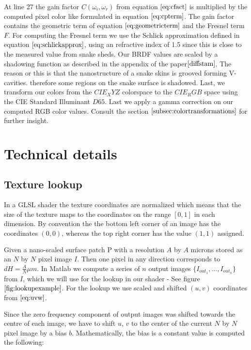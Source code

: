At line 27 the gain factor $C(\omega_i, \omega_r)$ from equation $\ref{eq:cfact}$ is multiplied by the computed pixel color like formulated in equation $\ref{eq:cpterm}$. The gain factor contains the geometric term of equation $\ref{eq:geometricterm}$ and the Fresnel term $F$. For computing the Fresnel term we use the Schlick approximation defined in equation $\ref{eq:schlickapprox}$, using an refractive index of 1.5 since this is close to the measured value from snake sheds. Our BRDF values are scaled by a shadowing function as described in the appendix of the paper$\cite{diffstam}$. The reason or this is that the nanostructure of a snake skins is grooved forming V-cavities. therefore some regions on the snake surface is shadowed. Last, we transform our colors from the $CIE_XYZ$ colorspace to the $CIE_RGB$ space using the CIE Standard Illuminant $D65$. Last we apply a gamma correction on our computed RGB color values. Consult the section $\ref{subsec:colortransformations}$ for further insight.

\section{Technical details}
\subsection{Texture lookup}
\label{sec:texturelookupcoords}
In a GLSL shader the texture coordinates are normalized which means that the size of the texture maps to the coordinates on the range $[0,1]$ in each dimension. By convention the the bottom left corner of an image has the coordinates $(0,0)$, whereas the top right corner has the value $(1,1)$ assigned. 

Given a nano-scaled surface patch P with a resolution $A$ by $A$ microns stored as an $N$ by $N$ pixel image $I$.
Then one pixel in any direction corresponds to $dH = \frac{A}{N} \mu m$. 
In Matlab we compute a series of $n$ output images $\{I_{out_1},...,I_{out_n}\}$ from $I$, which we will use for the lookup in our shader - See figure $\ref{fig:lookupexample}$. For the lookup we use scaled and shifted $(u,v)$ coordinates from $\ref{eq:uvw}$. 

Since the zero frequency component of output images was shifted towards the centre of each image, we have to shift $u$, $v$ to the center of the current $N$ by $N$ pixel image by a bias $b$. Mathematically, the bias is a constant value is computed the following:

